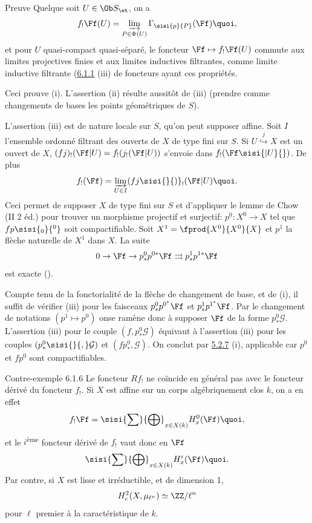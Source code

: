 \begin{enonce*}[remark]{Preuve}
Quel\pageoriginale que soit $U\in \Ob S_{\et}$, on a
\[
f_{!}\Ff (U)=\varinjlim_{P\in
\Phi(U)}\Gamma_{\sisi{p}{P}}(\Ff ){\quoi},
\]
et pour $U$ quasi-compact quasi-séparé, le foncteur
$\Ff \mapsto f_{!}\Ff (U)$ commute aux limites
projectives finies et aux limites inductives filtrantes, comme limite
inductive filtrante (\hyperref[XVII.prop6.1.1]{6.1.1}\sisi{)}{} (iii)\sisi{}{)} de foncteurs ayant ces propriétés.

Ceci prouve (i). L'assertion (ii) résulte aussitôt de (iii) (prendre
comme changements de bases les points géométriques de $S$).

L'assertion (iii) est de nature locale sur $S$, qu'on peut supposer
affine. Soit $I$ l'ensemble ordonné filtrant des ouverts de $X$ de
type fini sur $S$. Si
$U\overset{j}{\hookrightarrow}X$
est un ouvert de $X$,
$(fj)_{!}(\Ff |U)=f_{!}(j_{!}(\Ff |U))$ s'envoie dans
$f_{!}(\Ff\sisi{|U}{})$. De plus
$$
f_{!}(\Ff )=\varinjlim_{U\in I}
(fj\sisi{}{)}_{!}(\Ff |U){\quoi}.
$$
Ceci permet de supposer $X$ de type fini sur $S$ et d'appliquer le
lemme de Chow (\EGA II 2 éd.) pour trouver un morphisme projectif et
surjectif: $p^{0}:X^{0}\rightarrow X$ tel que $fp\sisi{_{0}}{^0}$
soit compactifiable. Soit $X^{1}=\fprod{X^{0}}{X^{0}}{X}$ et $p^{1}$
la flèche naturelle de $X^{1}$ dans $X$. La suite
$$
0\rightarrow \Ff \rightarrow
p^{0}_{\ast}p^{0{\ast}}\Ff \rightrightarrows
p^{1}_{\ast}p^{1{\ast}}\Ff
$$
est exacte ().

Compte tenu de la fonctorialité de la flèche de changement de base, et
de (i), il suffit de vérifier (iii) pour les faisceaux
$p^{0}_{\ast}p^{0^{\ast}}\Ff $ et
$p^{1}_{\ast}p^{1^{\ast}}\Ff $. Par le changement de notations
$(p^{1}\mapsto p^{0})$ on\pageoriginale se ramène donc à supposer
$\Ff $ de la forme $p^{0}_{\ast}\mathcal{G}$. L'assertion
(iii) pour le couple $(f,p^{0}_{\ast}\mathcal{G})$ équivaut à
l'assertion (iii) pour les couples $(p^{0}_{\ast}\sisi{}{,}\mathcal{G})$ et
$(fp^{0}_{\ast},\mathcal{G})$. On conclut par \hyperref[XVII.var5.2.7]{5.2.7} (i), applicable
car $p^{0}$ et $fp^{0}$ sont compactifiables.
\end{enonce*}

\begin{enonce*}[remark]{Contre-exemple 6.1.6}
Le foncteur $Rf_{!}$ ne coïncide en général pas avec le foncteur
dérivé du foncteur $f_{!}$. Si $X$ est affine sur un corps
algébriquement clos $k$, on a en effet
$$
f_{!}\Ff =\sisi{\sum}{\bigoplus}_{x\in X(k)}H^{0}_{x}(\Ff ){\quoi},
$$
et le $i$\textsuperscript{ème} foncteur dérivé de $f_{!}$ vaut donc en
$\Ff $
$$
\sisi{\sum}{\bigoplus}_{x\in X(k)}H^{i}_{x}(\Ff ){\quoi}.
$$
Par contre, si $X$ est lisse et irréductible, et de dimension 1,
$$
H^{2}_{c}(X,\mu_{\ell^{n}})\simeq \ZZ/\ell^{n}
$$
pour $\ell$ premier à la caractéristique de $k$.
\end{enonce*}


